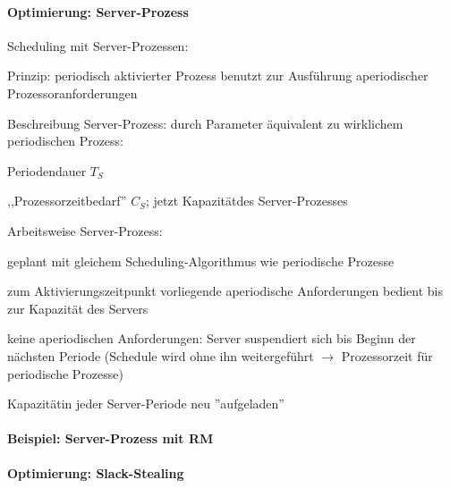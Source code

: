 \documentclass[a4paper]{article}
\begin{document}
\begin{multicols}{3}
    \paragraph{Optimierung:
        Server-Prozess}

    \begin{itemize*}
        \item
        Scheduling mit Server-Prozessen:
        \begin{itemize*}
            \item Prinzip: periodisch aktivierter Prozess benutzt zur Ausführung aperiodischer Prozessoranforderungen
            \item Beschreibung Server-Prozess: durch Parameter äquivalent zu wirklichem periodischen Prozess: \begin{itemize*} \item Periodendauer $T_S$ \item ,,Prozessorzeitbedarf'' $C_S$; jetzt Kapazitätdes Server-Prozesses \end{itemize*}
            \item Arbeitsweise Server-Prozess: \begin{itemize*} \item geplant mit gleichem Scheduling-Algorithmus wie periodische Prozesse \item zum Aktivierungszeitpunkt vorliegende aperiodische Anforderungen bedient bis zur Kapazität des Servers \item keine aperiodischen Anforderungen: Server suspendiert sich bis Beginn der nächsten Periode (Schedule wird ohne ihn weitergeführt $\rightarrow$ Prozessorzeit für periodische Prozesse) \item Kapazitätin jeder Server-Periode neu ''aufgeladen'' \end{itemize*}
        \end{itemize*}
    \end{itemize*}


    \paragraph{Beispiel: Server-Prozess mit
        RM}



    \paragraph{Optimierung:
        Slack-Stealing}


\end{multicols}
\end{document}
